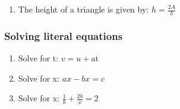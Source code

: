 {\begin{mdframed}[linewidth=4, leftmargin=40, rightmargin=40]
\begin{exercise}
\begin{enumerate}[noitemsep, label=\textbf{Step} \textbf{\arabic*}. ]
{\begin{equation}
      \end{equation}
    }{%
    \setlength{\mymathboxwidth}{\columnwidth}
      \addtolength{\mymathboxwidth}{-48pt}
    \par\vspace{12pt}\noindent\begin{minipage}{\columnwidth}
    \parbox[t]{\mymathboxwidth}{\large\begin{math}
    A=\frac{1}{2}bÃ---h2A=bÃ---h\left(\mathrm{multiply\; both\; sides\; by\; 2}\right)\frac{2A}{b}=h\left(\mathrm{divide\; both\; sides\; by\; b}\right)\end{math}}\hfill
    \parbox[t]{48pt}{\raggedleft 
    (9.83)}
    \end{minipage}\vspace{12pt}\par
    }%
    
        
        
        \item  
        \label{m39258*id1625465489}The height of a triangle is given by: \begin{math}h=\frac{2A}{b}\end{math}
 \par 
        \end{enumerate}
         

    \end{exercise}
    \end{mdframed}
    }
    \noindent
  
\label{m39258*id978342}
            \subsubsection{ Solving literal equations}
            \nopagebreak
             

\label{m39258*id9734}\begin{enumerate}[noitemsep, label=\textbf{\arabic*}. ] 
            \item Solve for t:
\begin{math}v=u+\mathrm{at}\end{math}\newline
            
\item Solve for x:
\begin{math}ax-bx=c\end{math}\newline
            
\item  Solve for x:
\begin{math}\frac{1}{b}+\frac{2b}{x}=2\end{math}
\newline
            
\end{enumerate}
        


